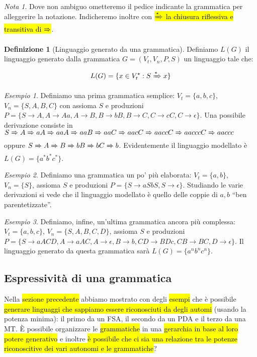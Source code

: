 \documentclass[a4paper,11pt,oneside]{article}
\theoremstyle{plain}
\theoremstyle{definition}
\newtheorem{defn}{Definizione}[section]
\theoremstyle{remark}
\newtheorem{esempio}{Esempio}[section]
\newtheorem*{nota}{Nota}
\newcommand*{\deriv}[1][]{\xRightarrow[#1]{}}
\newcommand*{\derivstar}[1][]{\xRightarrow[#1]{\star}}
\begin{document}
\begin{nota}
  Dove non ambiguo ometteremo il pedice indicante la grammatica per alleggerire
  la notazione. Indicheremo inoltre con \hl{$\derivstar$ la chiusura riflessiva
  e transitiva di $\deriv$}.
\end{nota}

\begin{defn}[Linguaggio generato da una grammatica]\label{def:ling-gen-grammatica}
  Definiamo $L(G)$ il linguaggio generato dalla grammatica
  $G = (V_t, V_n, P, S)$ un linguaggio tale che:

  \[
    L(G) = \{ x \in V_t^\star : S \derivstar x \}
  \]
\end{defn}

\begin{esempio}
  Definiamo una prima grammatica semplice: $V_t = \{a,b,c\}$, $V_n =
  \{S,A,B,C\}$ con assioma $S$ e produzioni $P = \{S \to A, A \to Aa, A \to B,
  B \to bB, B \to C, C \to cC, C \to \epsilon \}$. Una possibile derivazione
  consiste in $S \deriv A \deriv aA \deriv aaA \deriv aaB \deriv aaC \deriv aacC
  \deriv aaccC \deriv aacccC \deriv aaccc$ oppure $S \deriv A \deriv B \deriv bB
  \deriv bC \deriv b$. Evidentemente il linguaggio modellato è $L(G) =
  \{a^*b^*c^*\}$.
\end{esempio}

\begin{esempio}
  Definiamo una grammatica un po' più elaborata: $V_t = \{a,b\}$, $V_n = \{S\}$,
  assioma $S$ e produzioni $P = \{S \to aSbS, S \to \epsilon\}$. Studiando le
  varie derivazioni si vede che il linguaggio modellato è quello delle coppie di
  $a,b$ ``ben parentetizzate''.
\end{esempio}

\begin{esempio}
  Definiamo, infine, un'ultima grammatica ancora più complessa: $V_t =
  \{a,b,c\}$, $V_n = \{S,A,B,C,D\}$, assioma $S$ e produzioni
  $P = \{S \to aACD, A \to aAC, A \to \epsilon, B \to b, CD \to BDc, CB \to BC,
  D \to \epsilon\}$. Il linguaggio generato da questa grammatica sarà $L(G) =
  \{a^n b^n c^n \}$.
\end{esempio}

\subsection{Espressività di una grammatica}\label{sec:espressivita-grammatica}

Nella \hl{sezione precedente} abbiamo mostrato con degli \hl{esempi} che è
possibile \hl{generare linguaggi che sappiamo essere riconosciuti da degli
automi} (usando la potenza minima): il primo da un FSA, il secondo da un PDA e
il terzo da una MT\@.  È possibile organizzare le \hl{grammatiche} in una
\hl{gerarchia in base al loro potere generativo} e inoltre \hl{è possibile che
ci sia una relazione tra le potenze riconoscitive dei vari autonomi e le
grammatiche}?
\end{document}
